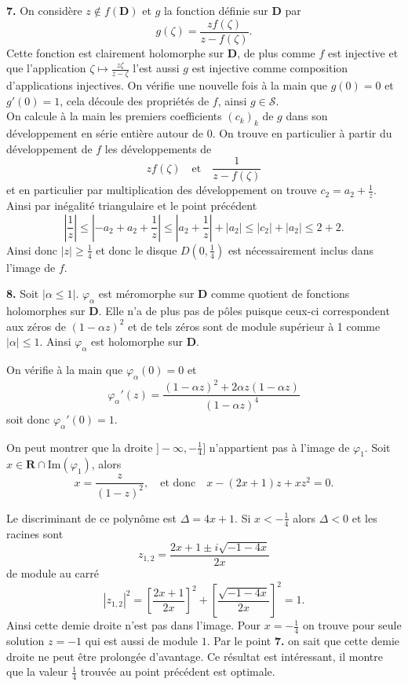 \documentclass[12pt]{article}
\newcommand{\R}{\mathbf{R}}
\begin{document}
 \bigskip

 \textbf{7.} On considère $z \not\in f(\mathbf{D})$ et $g$ la fonction définie sur $\mathbf{D}$ par \[
g(\zeta) = \frac{zf(\zeta)}{z -f(\zeta)}
.\] Cette fonction est clairement holomorphe sur $\mathbf{D}$, de plus comme $f$ est injective et que l'application $\zeta \longmapsto \frac{z\zeta}{z-\zeta}$ l'est aussi $g$ est injective comme composition d'applications injectives.
 On vérifie une nouvelle fois à la main que $g(0) = 0$ et $g'(0) = 1$, cela découle des propriétés de $f$, ainsi $g \in \mathcal{S}$. \\

 On calcule à la main les premiers coefficients $(c_{k})_{k}$ de $g$ dans son développement en série entière autour de 0. On trouve en particulier à partir du développement de $f$ les développements de \[
         zf(\zeta) \quad \text{et} \quad \frac{1}{z-f(\zeta)}
 \] et en particulier par multiplication des développement on trouve $c_{2} = a_{2} + \frac{1}{z}$. Ainsi par inégalité triangulaire et le point précédent \[
 |\frac{1}{z}| \le |-a_{2} + a_{2} + \frac{1}{z}| \le |a_{2} + \frac{1}{z}| + |a_2| \le |c_2| + |a_2| \le 2 + 2 
 .\] 
 Ainsi donc $|z| \ge \frac{1}{4}$ et donc le disque $D(0,\frac{1}{4})$ est nécessairement inclus dans l'image de $f$. 

 \bigskip

 \textbf{8.} Soit $|\alpha \le 1|$. $\varphi_{\alpha}$ est méromorphe sur $\mathbf{D}$ comme quotient de fonctions holomorphes sur $\mathbf{D}$. Elle n'a de plus pas de pôles puisque ceux-ci correspondent aux zéros de $(1-\alpha z)^{2}$ et de tels zéros sont de module supérieur à 1 comme  $|\alpha|\le 1$. Ainsi $\varphi_{\alpha}$ est holomorphe sur $\mathbf{D}$. 

 On vérifie à la main que $\varphi_{\alpha}(0) = 0$ et \[
         \varphi_{\alpha}'(z) = \frac{(1-\alpha z)^{2}+2\alpha z(1-\alpha z)}{(1-\alpha z)^{4}} 
 \] soit donc $\varphi_{\alpha}'(0) = 1$.   

 On peut montrer que la droite $]-\infty, -\frac{1}{4}]$ n'appartient pas à l'image de $\varphi_{1}$. Soit $x \in \R\cap\mathrm{Im}(\varphi_{1})$, alors  \[
         x = \frac{z}{(1-z)^{2}}, \quad \text{et donc} \quad x - (2x+1)z +xz^{2} = 0
 .\] 

 Le discriminant de ce polynôme est $\Delta = 4x +1$. Si $x<-\frac{1}{4}$ alors $\Delta < 0$ et les racines sont  \[
         z_{1,2} = \frac{2x+1\pm i\sqrt{-1-4x}}{2x}
\] de module au carré \[
|z_{1,2}|^{2} = [\frac{2x+1}{2x}]^{2} + [\frac{\sqrt{-1-4x}}{2x}]^{2} = 1
.\] Ainsi cette demie droite n'est pas dans l'image. Pour $x = -\frac{1}{4}$ on trouve pour seule solution $z = -1$ qui est aussi de module $1$. Par le point \textbf{7.} on sait que cette demie droite ne peut être prolongée d'avantage. Ce résultat est intéressant, il montre que la valeur $\frac{1}{4}$ trouvée au point précédent est optimale. 
\end{document}
